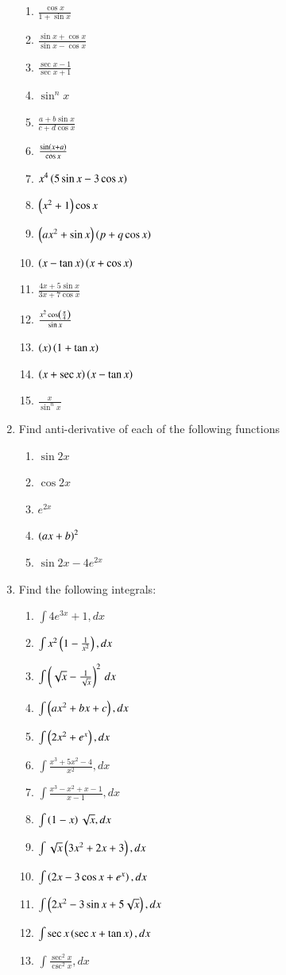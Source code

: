\begin{enumerate}[label=\arabic*.,ref=\thesubsection.\theenumi]
\begin{enumerate}[label=(\roman*)]
\item  $\frac{\cos x}{1+\sin x}$
\item  $\frac{\sin x + \cos x}{\sin x - \cos x}$
\item  $\frac{\sec x - 1}{\sec x + 1}$
\item  $\sin^n x$
\item  $\frac{a+b\sin x}{c+d\cos x}$
\item  $\frac{\sin\left(x+ a\right)}{\cos x}$
\item  $x^4\left(5\sin x - 3 \cos x\right)$
\item  $\left(x^2+1\right)\cos x$
\item  $\left(ax^2+\sin x\right)\left(p +q\cos x\right)$
\item  $\left(x-\tan x\right)\left(x +\cos x\right)$
\item  $\frac{4x+5\sin x}{3x+7\cos x}$
\item  $\frac{x^2\cos \left(\frac{\pi}{4}\right)}{\sin x}$
\item  $\left(x\right)\left(1+\tan x\right)$
\item  $\left(x+\sec x\right)\left(x -\tan x\right)$
\item  $\frac{x}{\sin^n x}$
%
\end{enumerate}
%
\item Find anti-derivative of each of the following functions
\begin{enumerate}
\item $\sin 2x$
\item $\cos 2x$
\item $e^{ 2x}$
\item $\left( ax+b\right)^2$
\item $\sin 2x - 4e^{2x}$
\end{enumerate}
%
\item Find the following integrals:
\begin{enumerate}
\item $\int 4e^{3x}+1,dx$
\item $\int x^2\left(1-\frac{1}{x^2}\right),dx$
\item $\int\left(\sqrt{x}-\frac{1}{\sqrt{x}}\right)^2\,dx$
\item $\int \left(ax^2+bx+c\right),dx$
\item $\int \left(2x^2+e^x\right),dx$
\item $\int \frac{x^3+5x^2-4}{x^2},dx$
\item $\int \frac{x^3-x^2+x-1}{x-1},dx$
\item $\int \left(1-x\right)\sqrt{x},dx$
\item $\int \sqrt{x}\left(3x^2+2x+3\right),dx$
\item $\int \left(2x-3\cos x + e^x\right),dx$
\item $\int \left(2x^2-3\sin x + 5\sqrt{x}\right),dx$
\item $\int \sec x\left(\sec x + \tan x\right),dx$
\item $\int \frac{\sec^2 x}{\csc^2x},dx$


\end{enumerate}
\end{enumerate}
